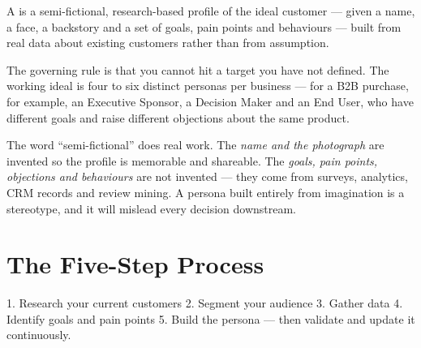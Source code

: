 \documentclass{MMTextbook}
\begin{document}
\begin{definitionbox}
A  is a semi-fictional, research-based profile of the
ideal customer --- given a name, a face, a backstory and a set of goals, pain
points and behaviours --- built from real data about existing customers rather
than from assumption.
\end{definitionbox}

The governing rule is that you cannot hit a target you have not defined. The
working ideal is four to six distinct personas per business --- for a B2B
purchase, for example, an Executive Sponsor, a Decision Maker and an End User,
who have different goals and raise different objections about the same product.

\begin{warnbox}
The word ``semi-fictional'' does real work. The \emph{name and the photograph}
are invented so the profile is memorable and shareable. The \emph{goals, pain
points, objections and behaviours} are not invented --- they come from surveys,
analytics, CRM records and review mining. A persona built entirely from
imagination is a stereotype, and it will mislead every decision downstream.
\end{warnbox}

\section{The Five-Step Process}

\begin{frameworkbox}
1. Research your current customers \ra{} 2. Segment your audience \ra{}
3. Gather data \ra{} 4. Identify goals and pain points \ra{} 5. Build the
persona --- then validate and update it continuously.
\end{frameworkbox}
\end{document}
